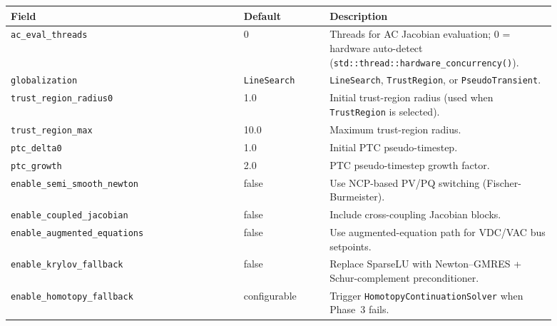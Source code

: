 \begin{longtable}{L{0.38\linewidth}L{0.14\linewidth}L{0.37\linewidth}}
\toprule
Field & Default & Description \\
\midrule
\endhead
\texttt{ac\_eval\_threads} & 0 & Threads for AC Jacobian evaluation; 0 = hardware auto-detect (\texttt{std::thread::hardware\_concurrency()}). \\
\texttt{globalization} & \texttt{LineSearch} & \texttt{LineSearch}, \texttt{TrustRegion}, or \texttt{PseudoTransient}. \\
\texttt{trust\_region\_radius0} & 1.0 & Initial trust-region radius (used when \texttt{TrustRegion} is selected). \\
\texttt{trust\_region\_max} & 10.0 & Maximum trust-region radius. \\
\texttt{ptc\_delta0} & 1.0 & Initial PTC pseudo-timestep. \\
\texttt{ptc\_growth} & 2.0 & PTC pseudo-timestep growth factor. \\
\texttt{enable\_semi\_smooth\_newton} & false & Use NCP-based PV/PQ switching (Fischer-Burmeister). \\
\texttt{enable\_coupled\_jacobian} & false & Include cross-coupling Jacobian blocks. \\
\texttt{enable\_augmented\_equations} & false & Use augmented-equation path for VDC/VAC bus setpoints. \\
\texttt{enable\_krylov\_fallback} & false & Replace SparseLU with Newton--GMRES + Schur-complement preconditioner. \\
\texttt{enable\_homotopy\_fallback} & configurable & Trigger \texttt{HomotopyContinuationSolver} when Phase~3 fails. \\
\bottomrule
\end{longtable}
\label{tab:pf-options-flat}
